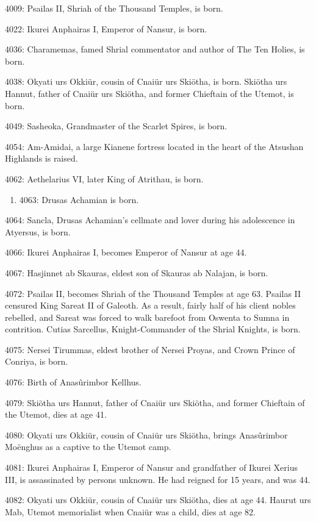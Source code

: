 \documentclass[]{book}
\providecommand{\tightlist}{%
  \setlength{\itemsep}{0pt}\setlength{\parskip}{0pt}}
\begin{document}
4009: Psailas II, Shriah of the Thousand Temples, is born.

4022: Ikurei Anphairas I, Emperor of Nansur, is born.

4036: Charamemas, famed Shrial commentator and author of The Ten Holies, is
born.

4038: Okyati urs Okkiür, cousin of Cnaiür urs Skiötha, is born. Skiötha urs Hannut,
father of Cnaiür urs Skiötha, and former Chieftain of the Utemot, is born.

4049: Sasheoka, Grandmaster of the Scarlet Spires, is born.

4054: Am-Amidai, a large Kianene fortress located in the heart of the Atsushan
Highlands is raised.

4062: Aethelarius VI, later King of Atrithau, is born.

\begin{enumerate}
\def\labelenumi{\alph{enumi}.}
\setcounter{enumi}{2}
\tightlist
\item
  4063: Drusas Achamian is born.
\end{enumerate}

4064: Sancla, Drusas Achamian's cellmate and lover during his adolescence in
Atyersus, is born.

4066: Ikurei Anphairas I, becomes Emperor of Nansur at age 44.

4067: Hasjinnet ab Skauras, eldest son of Skauras ab Nalajan, is born.

4072: Psailas II, becomes Shriah of the Thousand Temples at age 63. Psailas II
censured King Sareat II of Galeoth. As a result, fairly half of his client nobles
rebelled, and Sareat was forced to walk barefoot from Oswenta to Sumna in
contrition. Cutias Sarcellus, Knight-Commander of the Shrial Knights, is born.

4075: Nersei Tirummas, eldest brother of Nersei Proyas, and Crown Prince of
Conriya, is born.

4076: Birth of Anasûrimbor Kellhus.

4079: Skiötha urs Hannut, father of Cnaiür urs Skiötha, and former Chieftain of the
Utemot, dies at age 41.

4080: Okyati urs Okkiür, cousin of Cnaiür urs Skiötha, brings Anasûrimbor
Moënghus as a captive to the Utemot camp.

4081: Ikurei Anphairas I, Emperor of Nansur and grandfather of Ikurei Xerius III, is
assassinated by persons unknown. He had reigned for 15 years, and was 44.

4082: Okyati urs Okkiür, cousin of Cnaiür urs Skiötha, dies at age 44. Haurut urs
Mab, Utemot memorialist when Cnaiür was a child, dies at age 82.
\end{document}

